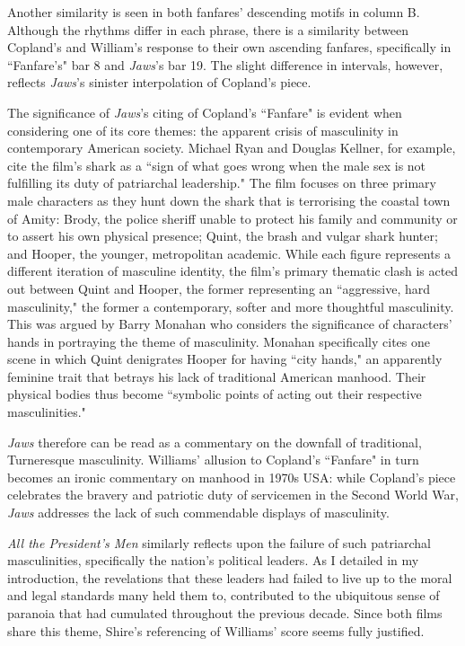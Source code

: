 Another similarity is seen in both fanfares' descending motifs in column B.
Although the rhythms differ in each phrase, there is a similarity between Copland's and William's response to their own ascending fanfares, specifically in ``Fanfare's" bar 8 and \textit{Jaws}'s bar 19.
The slight difference in intervals, however, reflects \textit{Jaws}'s sinister interpolation of Copland's piece.

The significance of \textit{Jaws}'s citing of Copland's ``Fanfare" is evident when considering one of its core themes: the apparent crisis of masculinity in contemporary American society.
Michael Ryan and Douglas Kellner, for example, cite the film's shark as a ``sign of what goes wrong when the male sex is not fulfilling its duty of patriarchal leadership."\autocites[][60]{ryan_camera_1988}
The film focuses on three primary male characters as they hunt down the shark that is terrorising the coastal town of Amity: Brody, the police sheriff unable to protect his family and community or to assert his own physical presence; Quint, the brash and vulgar shark hunter; and Hooper, the younger, metropolitan academic.
While each figure represents a different iteration of masculine identity, the film's primary thematic clash is acted out between Quint and Hooper, the former representing an ``aggressive, hard masculinity," the former a contemporary, softer and more thoughtful masculinity. 
This was argued by Barry Monahan who considers the significance of characters' hands in portraying the theme of masculinity.
Monahan specifically cites one scene in which Quint denigrates Hooper for having ``city hands," an apparently feminine trait that betrays his lack of traditional American manhood.\autocites[][250]{monahan_hands_2022}
Their physical bodies thus become ``symbolic points of acting out their respective masculinities."\autocites[][251]{monahan_hands_2022}

\textit{Jaws} therefore can be read as a commentary on the downfall of traditional, Turneresque masculinity.
Williams' allusion to Copland's ``Fanfare" in turn becomes an ironic commentary on manhood in 1970s USA:
while Copland's piece celebrates the bravery and patriotic duty of servicemen in the Second World War, \textit{Jaws} addresses the lack of such commendable displays of masculinity.

\textit{All the President's Men} similarly reflects upon the failure of such patriarchal masculinities, specifically the nation's political leaders.
As I detailed in my introduction, the revelations that these leaders had failed to live up to the moral and legal standards many held them to, contributed to the ubiquitous sense of paranoia that had cumulated throughout the previous decade.
Since both films share this theme, Shire's referencing of Williams' score seems fully justified.\autocites[This connection is exacerbated in some analyses of \textit{Jaws} which draw a parallel between President Nixon and Amity's Major Vaughn, who insists on keeping the beaches open to maximise tourist revenue despite the evident threat posed by the shark. Peter Biskind, for example, notes that Vaughn ``repeatedly invokes `the public interest' as Nixon invoked `national security' to legitimate the various extravagances of his administration."][]{biskind_jaws_1975}

